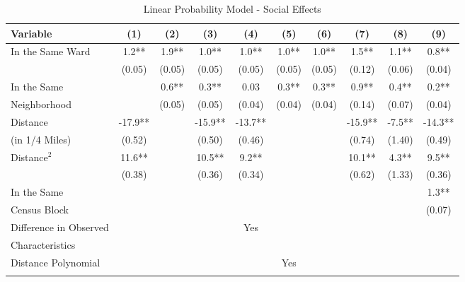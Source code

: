 \documentclass[AEJ,draftmode]{AEA}
\newcommand{\se}[1]{\footnotesize{(#1)}}
\begin{document}
\begin{sidewaystable}[ht]
\centering
\caption{Linear Probability Model - Social Effects}
\begin{tabular}{@{}lccccccccc@{}} \toprule
Variable                                 &(1)      &(2)      &(3)      &(4)      &(5)      &(6)      &(7)      &(8)      & (9)     \\\midrule
\multirow{2}{*}{In the Same Ward}        &1.2**    &1.9**    &1.0**    &1.0**    &1.0**    &1.0**    &1.5**    &1.1**    & 0.8**   \\
                                         &\se{0.05}&\se{0.05}&\se{0.05}&\se{0.05}&\se{0.05}&\se{0.05}&\se{0.12}&\se{0.06}&\se{0.04}\\
In the Same                              &         &0.6**    &0.3**    &0.03     &0.3**    &0.3**    &0.9**    &0.4**    & 0.2**   \\
\hspace{.5cm}Neighborhood                     &         &\se{0.05}&\se{0.05}&\se{0.04}&\se{0.04}&\se{0.04}&\se{0.14}&\se{0.07}&\se{0.04}\\
Distance                                 &-17.9**  &         &-15.9**  &-13.7**  &         &         &-15.9**  &-7.5**   &-14.3**  \\
\hspace{.5cm}(in 1/4 Miles)              &\se{0.52}&         &\se{0.50}&\se{0.46}&         &         &\se{0.74}&\se{1.40}&\se{0.49}\\
\multirow{2}{*}{Distance$^2$ }           &11.6**   &         &10.5**   &9.2**    &         &         &10.1**   &4.3**    &9.5**    \\
                                         &\se{0.38}&         &\se{0.36}&\se{0.34}&         &         &\se{0.62}&\se{1.33}&\se{0.36}\\
In the Same                              &         &         &         &         &         &         &         &         & 1.3**   \\
\hspace{.5cm} Census Block               &         &         &         &         &         &         &         &         &\se{0.07}\\
Difference in Observed&&&            & Yes &&&         &         &              \\
\hspace{.5cm} Characteristics\\
Distance Polynomial &         &         &         &             &Yes &  &  &  &                  \\\addlinespace

\end{tabular}
\end{sidewaystable}
\end{document}
